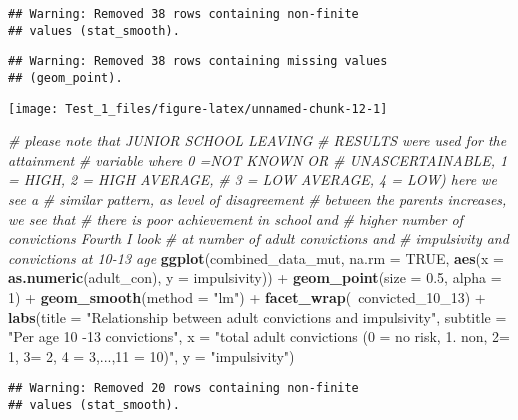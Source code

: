 \documentclass[]{tufte-handout}
\newenvironment{Shaded}{}{}
\newcommand{\KeywordTok}[1]{\textcolor[rgb]{0.00,0.44,0.13}{\textbf{#1}}}
\newcommand{\DataTypeTok}[1]{\textcolor[rgb]{0.56,0.13,0.00}{#1}}
\newcommand{\DecValTok}[1]{\textcolor[rgb]{0.25,0.63,0.44}{#1}}
\newcommand{\FloatTok}[1]{\textcolor[rgb]{0.25,0.63,0.44}{#1}}
\newcommand{\StringTok}[1]{\textcolor[rgb]{0.25,0.44,0.63}{#1}}
\newcommand{\CommentTok}[1]{\textcolor[rgb]{0.38,0.63,0.69}{\textit{#1}}}
\newcommand{\OtherTok}[1]{\textcolor[rgb]{0.00,0.44,0.13}{#1}}
\newcommand{\OperatorTok}[1]{\textcolor[rgb]{0.40,0.40,0.40}{#1}}
\newcommand{\NormalTok}[1]{#1}
\begin{document}
\begin{verbatim}
## Warning: Removed 38 rows containing non-finite
## values (stat_smooth).
\end{verbatim}

\begin{verbatim}
## Warning: Removed 38 rows containing missing values
## (geom_point).
\end{verbatim}

\texttt{[image: Test\_1\_files/figure-latex/unnamed-chunk-12-1]}

\begin{Shaded}
\begin{Highlighting}[]
\CommentTok{# please note that JUNIOR SCHOOL LEAVING}
\CommentTok{# RESULTS were used for the attainment}
\CommentTok{# variable where 0 =NOT KNOWN OR}
\CommentTok{# UNASCERTAINABLE, 1 = HIGH, 2 = HIGH AVERAGE,}
\CommentTok{# 3 = LOW AVERAGE, 4 = LOW) here we see a}
\CommentTok{# similar pattern, as level of disagreement}
\CommentTok{# between the parents increases, we see that}
\CommentTok{# there is poor achievement in school and}
\CommentTok{# higher number of convictions Fourth I look}
\CommentTok{# at number of adult convictions and}
\CommentTok{# impulsivity and convictions at 10-13 age}
\KeywordTok{ggplot}\NormalTok{(combined_data_mut, }\DataTypeTok{na.rm =} \OtherTok{TRUE}\NormalTok{, }\KeywordTok{aes}\NormalTok{(}\DataTypeTok{x =} \KeywordTok{as.numeric}\NormalTok{(adult_con), }
    \DataTypeTok{y =}\NormalTok{ impulsivity)) }\OperatorTok{+}\StringTok{ }\KeywordTok{geom_point}\NormalTok{(}\DataTypeTok{size =} \FloatTok{0.5}\NormalTok{, }
    \DataTypeTok{alpha =} \DecValTok{1}\NormalTok{) }\OperatorTok{+}\StringTok{ }\KeywordTok{geom_smooth}\NormalTok{(}\DataTypeTok{method =} \StringTok{"lm"}\NormalTok{) }\OperatorTok{+}\StringTok{ }
\StringTok{    }\KeywordTok{facet_wrap}\NormalTok{(}\OperatorTok{~}\NormalTok{convicted_10_}\DecValTok{13}\NormalTok{) }\OperatorTok{+}\StringTok{ }\KeywordTok{labs}\NormalTok{(}\DataTypeTok{title =} \StringTok{"Relationship between adult convictions and impulsivity"}\NormalTok{, }
    \DataTypeTok{subtitle =} \StringTok{"Per age 10 -13 convictions"}\NormalTok{, }\DataTypeTok{x =} \StringTok{"total adult convictions (0 = no risk, 1. non, 2= 1, 3= 2, 4 = 3,...,11 = 10)"}\NormalTok{, }
    \DataTypeTok{y =} \StringTok{"impulsivity"}\NormalTok{)}
\end{Highlighting}
\end{Shaded}

\begin{verbatim}
## Warning: Removed 20 rows containing non-finite
## values (stat_smooth).
\end{verbatim}
\end{document}
